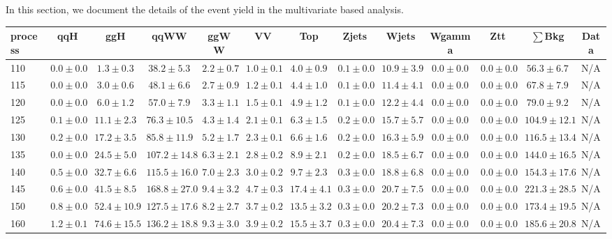 In this section, we document the details of the event yield in 
the multivariate based analysis.

\begin{table}
{%
 \tiny
 \begin{center}
 \begin{tabular}{l | c c | c c c c c c c c  | c c}
 \hline
 process & qqH & ggH & qqWW & ggWW & VV & Top & Zjets & Wjets & Wgamma & Ztt & $\sum$Bkg & Data \\
 \hline
110 & $0.0\pm0.0$ & $1.3\pm0.3$ & $38.2\pm5.3$ & $2.2\pm0.7$ & $1.0\pm0.1$ & $4.0\pm0.9$ & $0.1\pm0.0$ & $10.9\pm3.9$ & $0.0\pm0.0$ & $0.0\pm0.0$ & $56.3\pm6.7$ & N/A \\
115 & $0.0\pm0.0$ & $3.0\pm0.6$ & $48.1\pm6.6$ & $2.7\pm0.9$ & $1.2\pm0.1$ & $4.4\pm1.0$ & $0.1\pm0.0$ & $11.4\pm4.1$ & $0.0\pm0.0$ & $0.0\pm0.0$ & $67.8\pm7.9$ & N/A \\
120 & $0.0\pm0.0$ & $6.0\pm1.2$ & $57.0\pm7.9$ & $3.3\pm1.1$ & $1.5\pm0.1$ & $4.9\pm1.2$ & $0.1\pm0.0$ & $12.2\pm4.4$ & $0.0\pm0.0$ & $0.0\pm0.0$ & $79.0\pm9.2$ & N/A \\
125 & $0.1\pm0.0$ & $11.1\pm2.3$ & $76.3\pm10.5$ & $4.3\pm1.4$ & $2.1\pm0.1$ & $6.3\pm1.5$ & $0.2\pm0.0$ & $15.7\pm5.7$ & $0.0\pm0.0$ & $0.0\pm0.0$ & $104.9\pm12.1$ & N/A \\
130 & $0.2\pm0.0$ & $17.2\pm3.5$ & $85.8\pm11.9$ & $5.2\pm1.7$ & $2.3\pm0.1$ & $6.6\pm1.6$ & $0.2\pm0.0$ & $16.3\pm5.9$ & $0.0\pm0.0$ & $0.0\pm0.0$ & $116.5\pm13.4$ & N/A \\
135 & $0.0\pm0.0$ & $24.5\pm5.0$ & $107.2\pm14.8$ & $6.3\pm2.1$ & $2.8\pm0.2$ & $8.9\pm2.1$ & $0.2\pm0.0$ & $18.5\pm6.7$ & $0.0\pm0.0$ & $0.0\pm0.0$ & $144.0\pm16.5$ & N/A \\
140 & $0.5\pm0.0$ & $32.7\pm6.6$ & $115.5\pm16.0$ & $7.0\pm2.3$ & $3.0\pm0.2$ & $9.7\pm2.3$ & $0.3\pm0.0$ & $18.8\pm6.8$ & $0.0\pm0.0$ & $0.0\pm0.0$ & $154.3\pm17.6$ & N/A \\
145 & $0.6\pm0.0$ & $41.5\pm8.5$ & $168.8\pm27.0$ & $9.4\pm3.2$ & $4.7\pm0.3$ & $17.4\pm4.1$ & $0.3\pm0.0$ & $20.7\pm7.5$ & $0.0\pm0.0$ & $0.0\pm0.0$ & $221.3\pm28.5$ & N/A \\
150 & $0.8\pm0.0$ & $52.4\pm10.9$ & $127.5\pm17.6$ & $8.2\pm2.7$ & $3.7\pm0.2$ & $13.5\pm3.2$ & $0.3\pm0.0$ & $20.2\pm7.3$ & $0.0\pm0.0$ & $0.0\pm0.0$ & $173.4\pm19.5$ & N/A \\
160 & $1.2\pm0.1$ & $74.6\pm15.5$ & $136.2\pm18.8$ & $9.3\pm3.0$ & $3.9\pm0.2$ & $15.5\pm3.7$ & $0.3\pm0.0$ & $20.4\pm7.3$ & $0.0\pm0.0$ & $0.0\pm0.0$ & $185.6\pm20.8$ & N/A \\

\end{tabular}
\end{center}}
\end{table}
